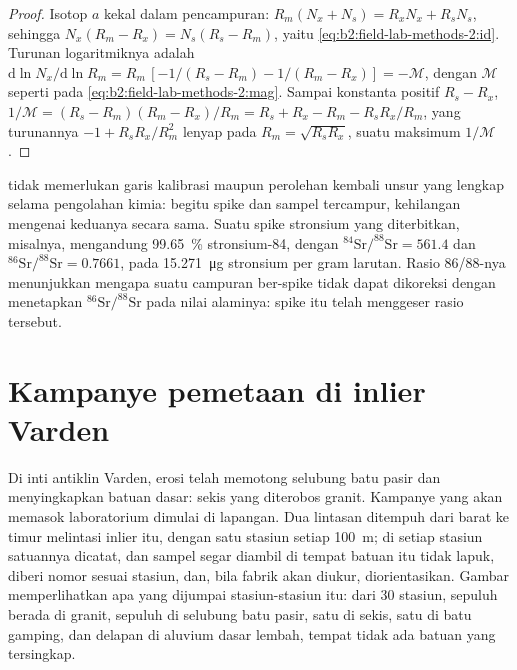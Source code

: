\begin{proof}
Isotop $a$ kekal dalam pencampuran: $R_m(N_x + N_s) = R_x N_x + R_s N_s$, sehingga $N_x(R_m - R_x) =
N_s(R_s - R_m)$, yaitu \eqref{eq:b2:field-lab-methods-2:id}. Turunan logaritmiknya adalah
$\mathrm{d}\ln N_x/\mathrm{d}\ln R_m = R_m\,[-1/(R_s - R_m) - 1/(R_m - R_x)] = -\mathcal{M}$, dengan
$\mathcal{M}$ seperti pada \eqref{eq:b2:field-lab-methods-2:mag}. Sampai konstanta positif $R_s - R_x$,
$1/\mathcal{M} = (R_s - R_m)(R_m - R_x)/R_m = R_s + R_x - R_m - R_sR_x/R_m$, yang turunannya
$-1 + R_sR_x/R_m^2$ lenyap pada $R_m = \sqrt{R_sR_x}$, suatu maksimum $1/\mathcal{M}$.
\end{proof}

 tidak memerlukan garis kalibrasi maupun perolehan kembali unsur yang lengkap selama
pengolahan kimia: begitu spike dan sampel tercampur, kehilangan mengenai keduanya secara sama. Suatu spike stronsium
yang diterbitkan, misalnya, mengandung \qty{99.65}{\percent} stronsium-84, dengan
$^{84}\mathrm{Sr}/^{88}\mathrm{Sr} = 561.4$ dan $^{86}\mathrm{Sr}/^{88}\mathrm{Sr} = 0.7661$, pada
\qty{15.271}{\micro\gram} stronsium per gram larutan. Rasio 86/88-nya menunjukkan mengapa  suatu campuran ber-spike tidak dapat dikoreksi dengan menetapkan $^{86}\mathrm{Sr}/^{88}\mathrm{Sr}$ pada
nilai alaminya: spike itu telah menggeser rasio tersebut.

\section{Kampanye pemetaan di inlier Varden}\label{sec:b2:field-lab-methods-2:campaign}

Di inti antiklin Varden, erosi telah memotong selubung batu pasir dan menyingkapkan
batuan dasar: sekis yang diterobos granit. Kampanye yang akan memasok laboratorium dimulai di
lapangan. Dua lintasan ditempuh dari barat ke timur melintasi inlier itu, dengan satu stasiun setiap
\qty{100}{m}; di setiap stasiun satuannya dicatat, dan sampel segar diambil di tempat batuan itu
tidak lapuk, diberi nomor sesuai stasiun, dan, bila fabrik akan diukur, diorientasikan. Gambar
memperlihatkan apa yang dijumpai stasiun-stasiun itu: dari 30 stasiun, sepuluh berada di granit, sepuluh di selubung batu pasir, satu di
sekis, satu di batu gamping, dan delapan di aluvium dasar lembah, tempat tidak ada batuan yang
tersingkap.

